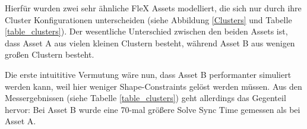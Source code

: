 Hierfür wurden zwei sehr ähnliche FleX Assets modelliert, die sich nur durch ihre Cluster Konfigurationen unterscheiden (siehe Abbildung \ref{Clusters} und Tabelle \ref{table_clusters}). Der wesentliche Unterschied zwischen den beiden Assets ist, dass Asset A aus vielen kleinen Clustern besteht, während Asset B aus wenigen großen Clustern besteht. 


Die erste intuititive Vermutung wäre nun, dass Asset B performanter simuliert werden kann, weil hier weniger Shape-Constraints gelöst werden müssen. Aus den Messergebnissen (siehe Tabelle \ref{table_clusters}) geht allerdings das Gegenteil hervor: Bei Asset B wurde eine 70-mal größere Solve Sync Time gemessen als bei Asset A. 


